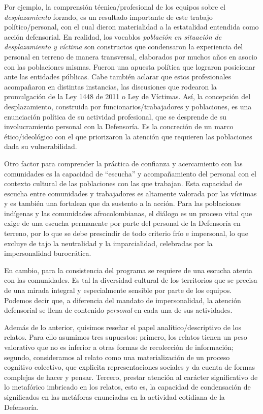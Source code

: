\documentclass[
  spanish,
  11pt,
  a4paper,
]{scrbook}
\begin{document}
Por ejemplo, la comprensión técnica/profesional de los equipos sobre el
\emph{desplazamiento} forzado, es un resultado importante de este
trabajo político/personal, con el cual dieron materialidad a la
estatalidad entendida como acción defensorial. En realidad, los vocablos
\emph{población en situación de desplazamiento y víctima} son
constructos que condensaron la experiencia del personal en terreno de
manera transversal, elaborados por muchos años en asocio con las
poblaciones mismas. Fueron una apuesta política que lograron posicionar
ante las entidades públicas. Cabe también aclarar que estos
profesionales acompañaron en distintas instancias, las discusiones que
rodearon la promulgación de la Ley 1448 de 2011 o Ley de Víctimas. Así,
la concepción del desplazamiento, construida por
funcionarios/trabajadores y poblaciones, es una enunciación política de
su actividad profesional, que se desprende de su involucramiento
personal con la Defensoría. Es la concreción de un marco
ético/ideológico con el que priorizaron la atención que requieren las
poblaciones dada su vulnerabilidad.

Otro factor para comprender la práctica de confianza y acercamiento con
las comunidades es la capacidad de ``escucha'' y acompañamiento del
personal con el contexto cultural de las poblaciones con las que
trabajan. Esta capacidad de escucha entre comunidades y trabajadores es
altamente valorada por las víctimas y es también una fortaleza que da
sustento a la acción. Para las poblaciones indígenas y las comunidades
afrocolombianas, el diálogo es un proceso vital que exige de una escucha
permanente por parte del personal de la Defensoría en terreno, por lo
que se debe prescindir de todo criterio frío e impersonal, lo que
excluye de tajo la neutralidad y la imparcialidad, celebradas por la
impersonalidad burocrática.

En cambio, para la consistencia del programa se requiere de una escucha
atenta con las comunidades. Es tal la diversidad cultural de los
territorios que se precisa de una mirada integral y especialmente
sensible por parte de los equipos. Podemos decir que, a diferencia del
mandato de impersonalidad, la atención defensorial se llena de contenido
\emph{personal} en cada una de sus actividades.

Además de lo anterior, quisimos reseñar el papel analítico/descriptivo
de los relatos. Para ello asumimos tres supuestos: primero, los relatos
tienen un peso valorativo que no es inferior a otras formas de
recolección de información; segundo, consideramos al relato como una
materialización de un proceso cognitivo colectivo, que explicita
representaciones sociales y da cuenta de formas complejas de hacer y
pensar. Tercero, prestar atención al carácter significativo de lo
metafórico imbricado en los relatos, esto es, la capacidad de
condensación de significados en las metáforas enunciadas en la actividad
cotidiana de la Defensoría.
\end{document}
